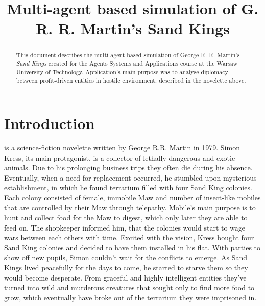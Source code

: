 \documentclass[conference]{IEEEtran}
\title{Multi-agent based simulation of G. R. R. Martin's Sand Kings}
\author{
\IEEEauthorblockN{Jakub Ciecierski, Viet Ba Mai, \\
					Michal Slupczynski and Wojciech Zyskowski}
					
\IEEEauthorblockA{Faculty of Mathematics and Information Science,\\ 
					Warsaw University of Technology \\
					Plac Politechniki 1, 00-660 Warsaw, Poland}
}
\begin{document}
\maketitle








\begin{abstract}

This document describes the multi-agent based simulation of George R. R. Martin's \textit{Sand Kings} created for the Agents Systems and Applications course at the Warsaw University of Technology. Application's main purpose was to analyse diplomacy between profit-driven entities in hostile environment, described in the novelette above. 

\end{abstract}




\section{Introduction}

\IEEEoverridecommandlockouts{} 
is a science-fiction novelette written by George R.R. Martin in 1979. Simon Kress, its main protagonist, is a collector of lethally dangerous and exotic animals. Due to his prolonging business trips they often die during his absence. Eventually, when a need for replacement occurred, he stumbled upon mysterious establishment, in which he found terrarium filled with four Sand King colonies. Each colony consisted of female, immobile Maw and number of insect-like mobiles that are controlled by their Maw through telepathy. Mobile's main purpose is to hunt and collect food for the Maw to digest, which only later they are able to feed on. The shopkeeper informed him, that the colonies would start to wage wars between each others with time.
Excited with the vision, Kress bought four Sand King colonies and decided to have them installed in his flat. With parties to show off new pupils, Simon couldn't wait for the conflicts to emerge. As Sand Kings lived peacefully for the days to come, he started to starve them so they would become desperate. From graceful and highly intelligent entities they've turned into wild and murderous creatures that sought only to find more food to grow, which eventually have broke out of the terrarium they were imprisoned in.
\end{document}
